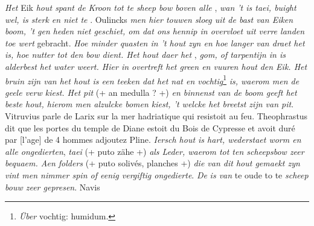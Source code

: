 \pstart \textit{Het} Eik \textit{hout\protect{} spant de Kroon tot te sheep bow\protect{} boven alle} , \textit{wan 't is taei, buight wel, is sterk en niet te} . Oulincks \textit{men hier touwen sloeg uit de bast van Eiken boom\protect{}, 't gen heden niet geschiet, om dat ons hennip\protect{} in overvloet uit verre landen toe wert} gebracht. \textit{Hoe minder quasten in 't hout\protect{} zyn en hoe langer van draet het is, hoe nutter tot den bow dient. Het hout\protect{} daer het} , \textit{gom, of tarpentijn\protect{} in is alderbest het water weert. Hier in overtreft het green\protect{} en vuuren hout}\protect{} \textit{den Eik\protect{}. Het bruin zijn van het hout\protect{} is een teeken dat het nat en vochtig}\footnote{\textit{\"{U}ber} vochtig: humidum.} \textit{is, waerom men de geele verw kiest. Het pit} (+ an medulla ? +) \textit{en binnenst van de boom geeft het beste hout\protect{}, hierom men alzulcke bomen kiest, 't welcke het breetst zijn van pit}. Vitruvius\protect{} parle de Larix\protect{} sur la mer hadriatique\protect{} qui resistoit au feu. Theophrastus\protect{} dit que les portes du temple de Diane\protect{} estoit du Bois de Cypresse\protect{} et avoit dur\'{e} par [l'age] de 4 hommes adjoutez Pline\protect{}. \textit{Iersch hout\protect{} is hart, wederstaet worm en alle ongedierten}\protect{}, \textit{taei} (+ puto z\"{a}he +) \textit{als Leder, waerom tot ten scheepsbow\protect{} zeer bequaem. Aen folders} (+ puto soliv\'{e}s, planches +) \textit{die van dit hout\protect{} gemaekt zyn vint men nimmer spin of eenig vergiftig ongedierte}\protect{}. \textit{De} \protect{} \textit{is van} te oude to te \textit{scheep bouw\protect{} zeer gepresen}. Navis\protect{} 